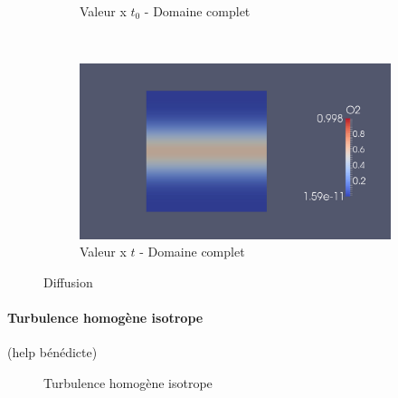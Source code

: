 \begin{figure}[t!]
\begin{subfigure}[b]{0.5\textwidth}
    \caption{\label{fig:diff_0_domain}Valeur x $t_0$ - Domaine complet}
  \end{subfigure}%
  ~ 
  \begin{subfigure}[b]{0.5\textwidth}
    \centering
    \includegraphics[width=.9\linewidth]{figures/diff_325.png}
    \caption{\label{fig:diff_325_domain}Valeur x $t$ - Domaine complet}
  \end{subfigure}
  \caption{\label{fig:diff_}Diffusion}
\end{figure}




\paragraph{Turbulence homogène isotrope}
(help bénédicte)

\begin{figure}[ht]
  \centering
  \caption{\label{fig:turbiso}Turbulence homogène isotrope}
\end{figure}



